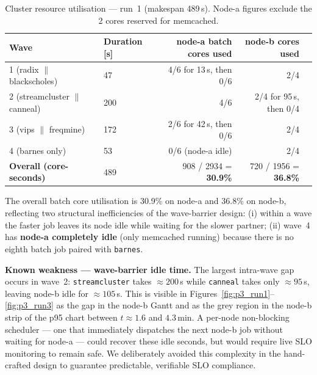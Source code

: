 \begin{table}[h]
\centering
\caption{Cluster resource utilisation — run~1 (makespan 489\,s).
  Node-a figures exclude the 2 cores reserved for memcached.}
\label{tab:utilisation}
\begin{tabular}{llrrr}
\toprule
\textbf{Wave} & \textbf{Duration [s]} &
\textbf{node-a batch cores used} &
\textbf{node-b cores used} \\
\midrule
1 (radix $\|$ blackscholes)         & 47  & 4/6 for 13\,s, then 0/6 & 2/4 \\
2 (streamcluster $\|$ canneal)      & 200 & 4/6                      & 2/4 for 95\,s, then 0/4 \\
3 (vips $\|$ freqmine)              & 172 & 2/6 for 42\,s, then 0/6 & 2/4 \\
4 (barnes only)                     & 53  & 0/6 (node-a idle)        & 2/4 \\
\midrule
\textbf{Overall (core-seconds)}     & 489 &
  908 / 2934 = \textbf{30.9\%} &
  720 / 1956 = \textbf{36.8\%} \\
\bottomrule
\end{tabular}
\end{table}

The overall batch core utilisation is 30.9\% on node-a and 36.8\% on
node-b, reflecting two structural inefficiencies of the wave-barrier
design: (i) within a wave the faster job leaves its node idle while
waiting for the slower partner; (ii) wave~4 has \textbf{node-a completely
idle} (only memcached running) because there is no eighth batch job
paired with \texttt{barnes}.

\textbf{Known weakness — wave-barrier idle time.}
The largest intra-wave gap occurs in wave~2: \texttt{streamcluster} takes
${\approx}200$\,s while \texttt{canneal} takes only ${\approx}95$\,s,
leaving node-b idle for ${\approx}105$\,s.
This is visible in Figures~\ref{fig:p3_run1}–\ref{fig:p3_run3} as the
gap in the node-b Gantt and as the grey region in the node-b strip of the
p95 chart between $t \approx 1.6$ and $4.3$\,min.
A per-node non-blocking scheduler — one that immediately dispatches the
next node-b job without waiting for node-a — could recover these idle
seconds, but would require live SLO monitoring to remain safe.
We deliberately avoided this complexity in the hand-crafted design to
guarantee predictable, verifiable SLO compliance.

